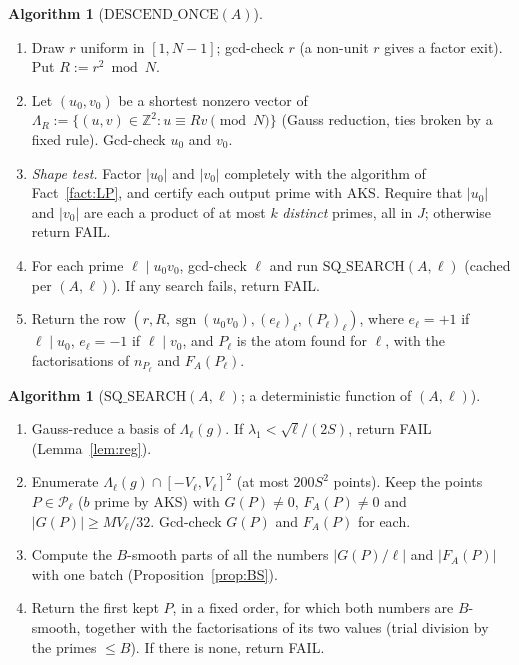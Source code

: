 \documentclass[11pt]{amsart}
\theoremstyle{definition}
\newtheorem{algorithm}[theorem]{Algorithm}
\newcommand{\Z}{\mathbb{Z}}
\newcommand{\cP}{\mathcal{P}}
\newcommand{\sgn}{\operatorname{sgn}}
\begin{document}
\begin{algorithm}[$\mathrm{DESCEND\_ONCE}(A)$]\label{alg:descend}
\begin{enumerate}[label=\arabic*.]
\item Draw $r$ uniform in $[1,N-1]$; gcd-check $r$ (a non-unit $r$ gives a factor exit). Put $R:=r^2\bmod N$.
\item Let $(u_0,v_0)$ be a shortest nonzero vector of $\Lambda_R:=\{(u,v)\in\Z^2:u\equiv Rv\pmod N\}$ (Gauss
  reduction, ties broken by a fixed rule). Gcd-check $u_0$ and $v_0$.
\item \emph{Shape test.} Factor $|u_0|$ and $|v_0|$ completely with the algorithm of Fact~\ref{fact:LP}, and certify each
  output prime with AKS. Require that $|u_0|$ and $|v_0|$ are each a product of at most $k$ \emph{distinct} primes, all
  in $J$; otherwise return FAIL.
\item For each prime $\ell\mid u_0v_0$, gcd-check $\ell$ and run $\mathrm{SQ\_SEARCH}(A,\ell)$ (cached per $(A,\ell)$). If any
  search fails, return FAIL.
\item Return the row $(r,R,\sgn(u_0v_0),(e_\ell)_\ell,(P_\ell)_\ell)$, where $e_\ell=+1$ if $\ell\mid u_0$, $e_\ell=-1$ if $\ell\mid v_0$,
  and $P_\ell$ is the atom found for $\ell$, with the factorisations of $n_{P_\ell}$ and $F_A(P_\ell)$.
\end{enumerate}
\end{algorithm}

\begin{algorithm}[$\mathrm{SQ\_SEARCH}(A,\ell)$; a deterministic function of $(A,\ell)$]\label{alg:sq}
\begin{enumerate}[label=\arabic*.]
\item Gauss-reduce a basis of $\Lambda_\ell(g)$. If $\lambda_1<\sqrt\ell/(2S)$, return FAIL (Lemma~\ref{lem:reg}).
\item Enumerate $\Lambda_\ell(g)\cap[-V_\ell,V_\ell]^2$ (at most $200S^2$ points). Keep the points $P\in\cP_\ell$ ($b$ prime by
  AKS) with $G(P)\ne0$, $F_A(P)\ne0$ and $|G(P)|\ge MV_\ell/32$. Gcd-check $G(P)$ and $F_A(P)$ for each.
\item Compute the $B$-smooth parts of all the numbers $|G(P)/\ell|$ and $|F_A(P)|$ with one batch (Proposition~\ref{prop:BS}).
\item Return the first kept $P$, in a fixed order, for which both numbers are $B$-smooth, together with the
  factorisations of its two values (trial division by the primes $\le B$). If there is none, return FAIL.
\end{enumerate}
\end{algorithm}
\end{document}
